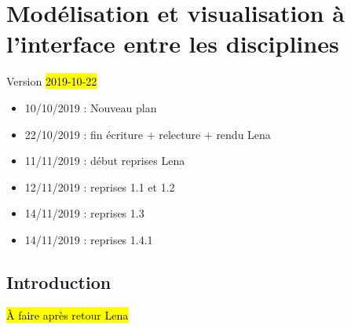 %

\chapter{Modélisation et visualisation à l'interface entre les disciplines}
\label{chap:chap1}
\begin{center}
	{\large Version \hl{2019-10-22}}
\end{center}

\begin{itemize}
	\item 10/10/2019 : Nouveau plan
	\item 22/10/2019 : fin écriture + relecture + rendu Lena
	\item 11/11/2019 : début reprises Lena
	\item 12/11/2019 : reprises 1.1 et 1.2
	\item 14/11/2019 : reprises 1.3
	\item 14/11/2019 : reprises 1.4.1
\end{itemize} 

\minitoc

\clearpage
\section*{Introduction}

\hl{À faire après retour Lena}


